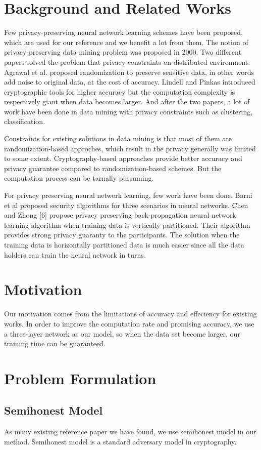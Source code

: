 \documentclass[twoside,twocolumn]{article}
\begin{document}
\section{Background and Related Works}
Few privacy-preserving neural network learning schemes have been proposed, which are used for our reference and we benefit a lot from them. The notion of privacy-preserving data mining problem was proposed in 2000. Two different papers solved the problem that privacy constraints on distributed environment. Agrawal et al. proposed randomization to preserve sensitive data, in other words add noise to original data, at the cost of accuracy. Lindell and Pinkas introduced cryptographic tools for higher accuracy but the computation complexity is respectively giant when data becomes larger. And after the two papers, a lot of work have been done in data mining with privacy constraints such as clustering, classification.

Constraints for existing solutions in data mining is that most of them are randomization-based approches, which result in the privacy generally was limited to some extent. Cryptography-based approaches provide better accuracy and privacy guarantee compared to randomization-based schemes. But the computation process can be tarnally pursuming.

For privacy preserving neural network learning, few work have been done. Barni et al proposed security algorithms for three scenarios in neural networks. Chen and Zhong [6] propose privacy preserving back-propagation neural network learning algorithm when training data is vertically partitioned. Their algorithm provides strong privacy guaranty to the participants. The solution when the training data is horizontally partitioned data is much easier since all the data holders can train the neural network in turns.

\section{Motivation}
Our motivation comes from the limitations of accuracy and effeciency for existing works. In order to improve the computation rate and promising accuracy, we use a three-layer network as our model, so when the data set become larger, our training time can be guaranteed.

\section{Problem Formulation}
\subsection{Semihonest Model}
As many existing reference paper we have found, we use semihonest model in our method. Semihonest model is a standard adversary model in cryptography.
\end{document}
